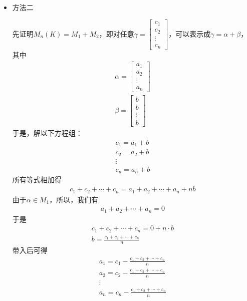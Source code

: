 \documentclass{article}
\begin{document}
\begin{itemize}
  \item 方法二

        先证明$M_n(K) = M_1 + M_2$，即对任意$\gamma  = \begin{bmatrix}
            c_1    \\
            c_2    \\
            \vdots \\
            c_n
          \end{bmatrix}$，可以表示成$\gamma = \alpha + \beta$，其中
        \begin{align*}
          \alpha = \begin{bmatrix}
                     a_1    \\
                     a_2    \\
                     \vdots \\
                     a_n
                   \end{bmatrix} \\
          \beta = \begin{bmatrix}
                    b      \\
                    b      \\
                    \vdots \\
                    b
                  \end{bmatrix}
        \end{align*}
        于是，解以下方程组：
        \begin{align*}
          c_1 = a_1 + b \\
          c_2 = a_2 + b \\
          \vdots        \\
          c_n = a_n + b
        \end{align*}
        所有等式相加得
        \begin{align*}
          c_1 + c_2 + \cdots + c_n = a_1 + a_2 + \cdots + a_n + n b
        \end{align*}
        由于$\alpha \in M_1$，所以，我们有
        \begin{align*}
          a_1 + a_2 + \cdots + a_n = 0
        \end{align*}
        于是
        \begin{align*}
          c_1 + c_2 + \cdots + c_n = 0 + n \cdot b \\
          b = \frac{c_1 + c_2 + \cdots + c_n}{n}
        \end{align*}
        带入后可得
        \begin{align*}
          a_1 = c_1 - \frac{c_1 + c_2 + \cdots + c_n}{n} \\
          a_2 = c_2 - \frac{c_1 + c_2 + \cdots + c_n}{n} \\
          \vdots                                         \\
          a_n = c_n - \frac{c_1 + c_2 + \cdots + c_n}{n}
        \end{align*}


\end{itemize}
\end{document}
